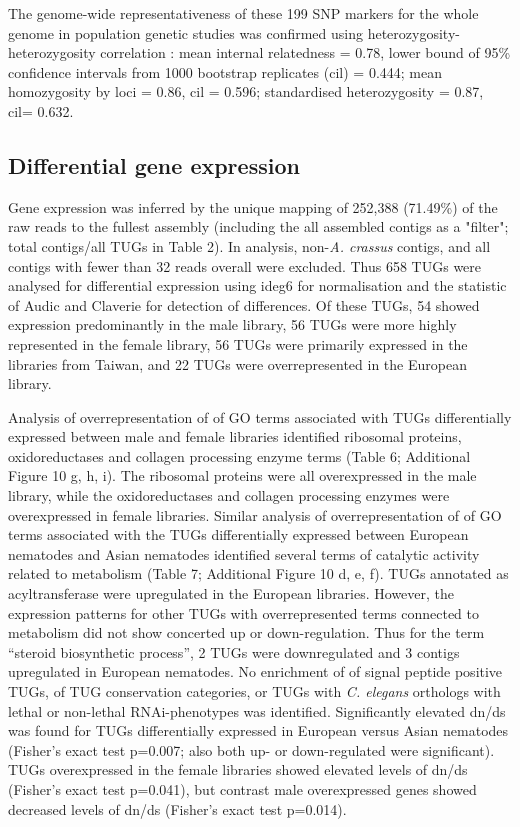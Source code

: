 \documentclass[10pt]{bmc_article}
\newenvironment{bmcformat}{\begin{raggedright}\baselineskip20pt\sloppy\setboolean{publ}{false}}{\end{raggedright}\baselineskip20pt\sloppy}
\begin{document}
\begin{bmcformat}
The genome-wide representativeness of these 199 SNP
markers for the whole genome in population genetic studies was
confirmed using heterozygosity-heterozygosity correlation
\cite{pmid21565077}: mean internal relatedness = 0.78, lower bound of
95\% confidence intervals from 1000 bootstrap replicates (cil) =
0.444; mean homozygosity by loci = 0.86, cil = 0.596; standardised
heterozygosity = 0.87, cil= 0.632.

 \subsection*{Differential gene expression}
                





Gene expression was inferred by the unique mapping of 252,388
(71.49\%) of the raw reads to the fullest assembly (including the all
assembled contigs as a "filter"; total contigs/all TUGs in Table
2). In analysis, non-\textit{A. crassus} contigs, and all contigs with
fewer than 32 reads overall were excluded. Thus
658 TUGs were analysed for differential expression
using ideg6 for normalisation and the statistic of Audic and Claverie
\cite{pmid9331369} for detection of differences. Of these TUGs, 54
showed expression predominantly in the male library, 56 TUGs were more
highly represented in the female library, 56 TUGs were primarily
expressed in the libraries from Taiwan, and 22 TUGs were
overrepresented in the European library.

Analysis of overrepresentation of of GO terms associated with TUGs
differentially expressed between male and female libraries identified
ribosomal proteins, oxidoreductases and collagen processing enzyme
terms (Table 6; Additional Figure 10 g, h, i). The ribosomal proteins were
all overexpressed in the male library, while the oxidoreductases and
collagen processing enzymes were overexpressed in female
libraries. Similar analysis of overrepresentation of of GO terms
associated with the TUGs differentially expressed between European
nematodes and Asian nematodes identified several terms of catalytic
activity related to metabolism (Table 7; Additional Figure 10
d, e, f). TUGs annotated as acyltransferase were upregulated in the
European libraries. However, the expression patterns for other TUGs
with overrepresented terms connected to metabolism did not show
concerted up or down-regulation. Thus for the term ``steroid
biosynthetic process'', 2 TUGs were downregulated and 3 contigs
upregulated in European nematodes. No enrichment of of signal peptide
positive TUGs, of TUG conservation categories, or TUGs with
\textit{C. elegans} orthologs with lethal or non-lethal
RNAi-phenotypes was identified. Significantly elevated dn/ds was found
for TUGs differentially expressed in European versus Asian nematodes
(Fisher's exact test p=0.007; also both up- or down-regulated were
significant). TUGs overexpressed in the female libraries showed
elevated levels of dn/ds (Fisher's exact test p=0.041), but contrast
male overexpressed genes showed decreased levels of dn/ds (Fisher's
exact test p=0.014).



\end{bmcformat}
\end{document}
